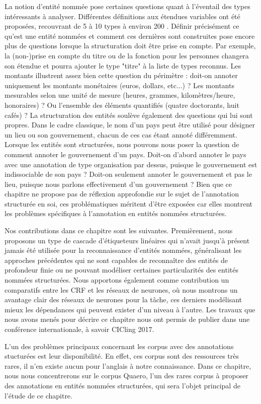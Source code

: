 \documentclass[PhD-Yoann-Dupont.tex]{subfiles}
\begin{document}
La notion d'entité nommée pose certaines questions quant à l'éventail des types intéressants à analyser. Différentes définitions aux étendues variables ont été proposées, recouvrant de 5 à 10 types \citep{grishman1996message,tjong2003introduction,sagot2012annotation} à environ 200 \citep{sekine2002extended}. Définir précisément ce qu'est une entité nommées et comment ces dernières sont construites pose encore plus de questions lorsque la structuration doit être prise en compte. Par exemple, la (non-)prise en compte du titre ou de la fonction pour les personnes changera son étendue et pourra ajouter le type "titre" à la liste de types reconnus. Les montants illustrent assez bien cette question du périmètre : doit-on annoter uniquement les montants monétaires (euros, dollars, etc...) ? Les montants mesurables selon une unité de mesure (heures, grammes, kilomètres/heure, honoraires) ? Ou l'ensemble des éléments quantifiés (quatre doctorants, huit cafés) ? La structuration des entités soulève également des questions qui lui sont propres. Dans le cadre classique, le nom d'un pays peut être utilisé pour désigner un lieu ou son gouvernement, chacun de ces cas étant annoté différemment. Lorsque les entités sont structurées, nous pouvons nous poser la question de comment annoter le gouvernement d'un pays. Doit-on d'abord annoter le pays avec une annotation de type organisation par dessus, puisque le gouvernement est indissociable de son pays ? Doit-on seulement annoter le gouvernement et pas le lieu, puisque nous parlons effectivement d'un gouvernement ? Bien que ce chapitre ne propose pas de réflexion approfondie sur le sujet de l'annotation structurée en soi, ces problématiques méritent d'être exposées car elles montrent les problèmes spécifiques à l'annotation en entités nommées structurées.

Nos contributions dans ce chapitre sont les suivantes. Premièrement, nous proposons un type de cascade d'étiqueteurs linéaires qui n'avait jusqu'à présent jamais été utilisée pour la reconnaissance d'entités nommées, généralisant les approches précédentes qui ne sont capables de reconnaître des entités de profondeur finie ou ne pouvant modéliser certaines particularités des entités nommées structurées. Nous apportons également comme contribution un comparatifs entre les CRF et les réseaux de neurones, où nous montrons un avantage clair des réseaux de neurones pour la tâche, ces derniers modélisant mieux les dépendances qui peuvent exister d'un niveau à l'autre. Les travaux que nous avons menés pour décrire ce chapitre nous ont permis de publier dans une conférence internationale, à savoir CICling 2017.

L'un des problèmes principaux concernant les corpus avec des annotations stucturées est leur disponibilité. En effet, ces corpus sont des ressources très rares, il n'en existe aucun pour l'anglais à notre connaissance. Dans ce chapitre, nous nous concentrerons sur le corpus Quaero, l'un des rares corpus à proposer des annotations en entités nommées structurées, qui sera l'objet principal de l'étude de ce chapitre.
\end{document}
